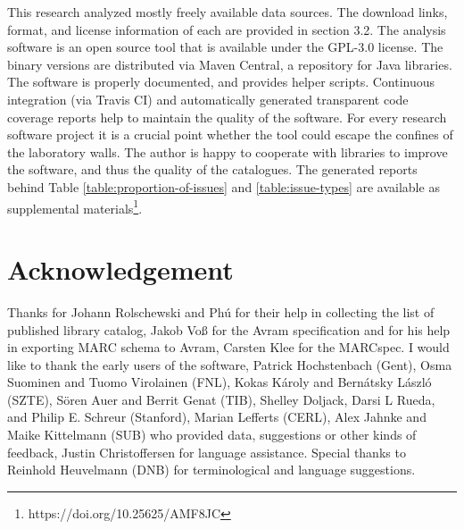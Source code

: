 This research analyzed mostly freely available data sources. The download links, format, and license information of each are provided in section 3.2. The analysis software is an open source tool that is available under the GPL-3.0 license. The binary versions are distributed via Maven Central, a repository for Java libraries. The software is properly documented, and provides helper scripts. Continuous integration (via Travis CI) and automatically generated transparent code coverage reports help to maintain the quality of the software. For every research software project it is a crucial point whether the tool could escape the confines of the laboratory walls. The author is happy to cooperate with libraries to improve the software, and thus the quality of the catalogues. The generated reports behind Table \ref{table:proportion-of-issues} and \ref{table:issue-types} are available as supplemental materials\footnote{https://doi.org/10.25625/AMF8JC}.

\section{Acknowledgement}
Thanks for Johann Rolschewski and Phú for their help in collecting the list of published library catalog, Jakob Voß for the Avram specification and for his help in exporting MARC schema to Avram, Carsten Klee for the MARCspec. I would like to thank the early users of the software, Patrick Hochstenbach (Gent), Osma Suominen and Tuomo Virolainen (FNL), Kokas Károly and Bernátsky László (SZTE), Sören Auer and Berrit Genat (TIB), Shelley Doljack, Darsi L Rueda, and Philip E. Schreur (Stanford), Marian Lefferts (CERL), Alex Jahnke and Maike Kittelmann (SUB) who provided data, suggestions or other kinds of feedback, Justin Christoffersen for language assistance. Special thanks to Reinhold Heuvelmann (DNB) for terminological and language suggestions.

% 
% 
